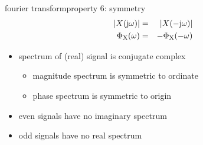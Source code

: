         \begin{frame}{fourier transform}{property 6: symmetry}
            \begin{eqnarray*}
                |X(\mathrm{j}\omega)| &=& |X(-\mathrm{j}\omega)|\\
                \Phi_\mathrm{X}(\omega) &=& -\Phi_\mathrm{X}(-\omega) 
            \end{eqnarray*}
            
            \bigskip
            \begin{itemize}
                \item<2->   spectrum of (real) signal is conjugate complex
                    \begin{itemize}
                        \item   magnitude spectrum is symmetric to ordinate
                        \item   phase spectrum is symmetric to origin
                    \end{itemize}
                \item<2->   even signals have no imaginary spectrum
                \item<2->   odd signals have no real spectrum
            \end{itemize}

\end{frame}
